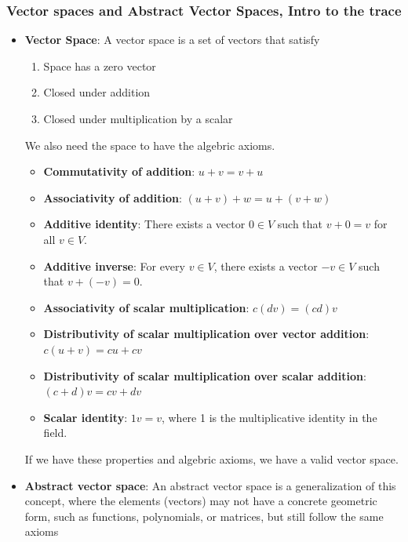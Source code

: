 \documentclass{report}
\begin{document}
    \subsubsection{Vector spaces and Abstract Vector Spaces, Intro to the trace}
    \begin{itemize}
        \item \textbf{Vector Space}: A vector space is a set of vectors that satisfy
            \begin{enumerate}
                \item Space has a zero vector
                \item Closed under addition
                \item Closed under multiplication by a scalar
            \end{enumerate}
            \bigbreak \noindent 
            We also need the space to have the algebric axioms.
            \begin{itemize}
                \item \textbf{Commutativity of addition}: \( u + v = v + u \)
                \item \textbf{Associativity of addition}: \( (u + v) + w = u + (v + w) \)
                \item \textbf{Additive identity}: There exists a vector \( 0 \in V \) such that \( v + 0 = v \) for all \( v \in V \).
                \item \textbf{Additive inverse}: For every \( v \in V \), there exists a vector \( -v \in V \) such that \( v + (-v) = 0 \).
                \item \textbf{Associativity of scalar multiplication}: \( c(dv) = (cd)v \)
                \item \textbf{Distributivity of scalar multiplication over vector addition}: \( c(u + v) = cu + cv \)
                \item \textbf{Distributivity of scalar multiplication over scalar addition}: \( (c + d)v = cv + dv \)
                \item \textbf{Scalar identity}: \( 1v = v \), where 1 is the multiplicative identity in the field.
            \end{itemize}
            \bigbreak \noindent 
            If we have these properties and algebric axioms, we have a valid vector space.
        \item \textbf{Abstract vector space}: An abstract vector space is a generalization of this concept, where the elements (vectors) may not have a concrete geometric form, such as functions, polynomials, or matrices, but still follow the same axioms

\end{itemize}
\end{document}
